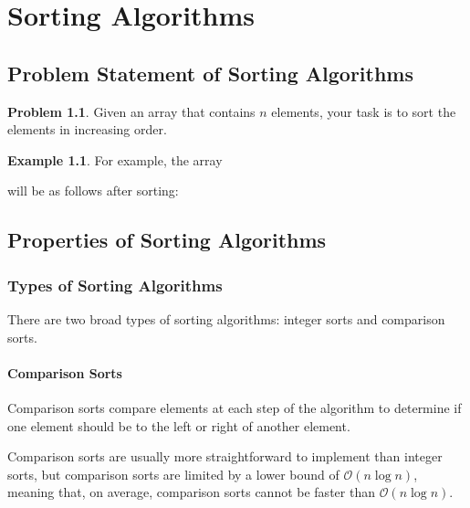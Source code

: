 \documentclass[twoside,12pt,a4paper,english]{book}
\theoremstyle{definition}
\newtheorem{exmp}{Example}[section]
\theoremstyle{problemstyle}
\newtheorem{problem}{Problem}[section] %
\begin{document}
\chapter{Sorting Algorithms}
\section{Problem Statement of Sorting Algorithms}
\begin{problem}
Given an array that contains $n$ elements, your task is to sort the elements in
increasing order.
\end{problem}
\begin{exmp}
For example, the array
\begin{center}
\end{center}
will be as follows after sorting:
\begin{center}
\end{center}
\end{exmp}
\section{Properties of Sorting Algorithms}
\subsection{Types of Sorting Algorithms}
There are two broad types of sorting algorithms: integer sorts and comparison sorts.
\subsubsection{Comparison Sorts}
Comparison sorts compare elements at each step of the algorithm to determine if one element should be to the left or right of another element.

Comparison sorts are usually more straightforward to implement than integer sorts, but comparison sorts are limited by a lower bound of $\mathcal{O}(n\log{n})$, meaning that, on average, comparison sorts cannot be faster than $\mathcal{O}(n\log{n})$.
\end{document}
